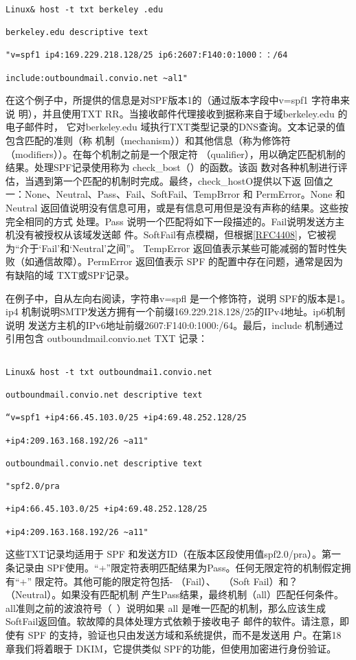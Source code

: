 \begin{verbatim}
    
Linux& host -t txt berkeley .edu

berkeley.edu descriptive text

"v=spf1 ip4:169.229.218.128/25 ip6:2607:F140:0:1000：：/64

include:outboundmail.convio.net ~al1"
\end{verbatim}

在这个例子中，所提供的信息是对SPF版本1的（通过版本字段中v=spf1 字符串来说
明），并且使用TXT RR。当接收邮件代理接收到据称来自于域berkeley.edu 的电子邮件时，
它对berkeley.edu 域执行TXT类型记录的DNS查询。文本记录的值包含匹配的准则（称
机制（mechanism））和其他信息（称为修饰符（modifiers））。在每个机制之前是一个限定符
（qualifier），用以确定匹配机制的结果。处理SPF记录使用称为 check\_bost（）的函数。该函
数对各种机制进行评估，当遇到第一个匹配的机制时完成。最终，check\_hostO提供以下返
回值之一：None、Neutral、Pass、Fail、SoftFail、TempBrror 和 PermError。None 和 Neutral
返回值说明没有信息可用，或是有信息可用但是没有声称的结果。这些按完全相同的方式
处理。Pass 说明一个匹配将如下一段描述的。Fail说明发送方主机没有被授权从该域发送邮
件。SoftFail有点模糊，但根据\href{https://www.rfc-editor.org/rfc/rfc4408}{[RFC4408]}，它被视为“介于‘Fail’和‘Neutral’之间”。
TempError 返回值表示某些可能减弱的暂时性失败（如通信故障）。PermError 返回值表示
SPF 的配置中存在问题，通常是因为有缺陷的域 TXT或SPF记录。

在例子中，自从左向右阅读，字符串v=spfl 是一个修饰符，说明 SPF的版本是1。ip4
机制说明SMTP发送方拥有一个前缀169.229.218.128/25的IPv4地址。ip6机制说明
发送方主机的IPv6地址前缀2607:F140:0:1000:/64。最后，include 机制通过引用包含
outboundmail.convio.net TXT 记录：

\begin{verbatim}
    
Linux& host -t txt outboundmai1.convio.net

outboundmail.convio.net descriptive text

“v=spf1 +ip4:66.45.103.0/25 +ip4:69.48.252.128/25

+ip4:209.163.168.192/26 ~a11"

outboundmail.convio.net descriptive text

"spf2.0/pra

+ip4:66.45.103.0/25 +ip4:69.48.252.128/25

+ip4:209.163.168.192/26 ~a11"
\end{verbatim}

\begin{tcolorbox}
    这些TXT记录均适用于 SPF 和发送方ID（在版本区段使用值spf2.0/pra）。第一
    条记录由 SPF使用。“+”限定符表明匹配结果为Pass。任何无限定符的机制假定拥有“+”
    限定符。其他可能的限定符包括- （Fail）、~ （Soft Fail）和？（Neutral）。如果没有匹配机制
    产生Pass结果，最终机制（all）匹配任何条件。all准则之前的波浪符号（~）说明如果 all
    是唯一匹配的机制，那么应该生成SoftFail返回值。软故障的具体处理方式依赖于接收电子
    邮件的软件。请注意，即使有 SPF 的支持，验证也只由发送方域和系统提供，而不是发送用
    户。在第18 章我们将着眼于 DKIM，它提供类似 SPF的功能，但使用加密进行身份验证。
\end{tcolorbox}

